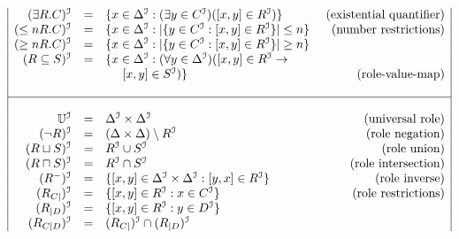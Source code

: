 \documentclass[a4paper,UKenglish]{lipics}
\newcommand{\universalrole}{\mathbb{U}}
\begin{document}
\begin{table}
\begin{math}
\begin{array}{|rclr|}
(\exists R.C)^{\I}& = & \{x \in \Delta^{\I} : (\exists y \in C^{\I})([x,y] \in R^{\I}) \}
&\mbox{ (existential quantifier)}\\
(\leq n R.C)^{\I} & = & \{x \in \Delta^{\I} : |\{y \in C^{\I} : [x,y] \in R^{\I} \}| \leq n\} & \mbox{ (number restrictions)}\\
(\geq n R.C)^{\I} & = & \{x \in \Delta^{\I} : |\{y \in C^{\I} : [x,y] \in R^{\I} \}| \geq n\} &\\
(R \subseteq S)^{\I} & = & \{x \in \Delta^{\I} : (\forall y \in \Delta^{\I})([x,y] \in R^{\I} \rightarrow &\\
  &&\;\;\;\;\;[x,y] \in S^{\I})\}& \mbox{ (role-value-map)}\\
&&&\\
\hline
&&&\\
\universalrole^{\I} & = & \Delta^{\I} \times \Delta^{\I} & \mbox{ (universal role)}\\
(\neg R)^{\I} & = & (\Delta \times \Delta) \setminus R^{\I} & \mbox{  (role negation)}\\
(R \sqcup S)^{\I} & = & R^{\I} \cup S^{\I} & \mbox{ (role union)}\\
(R \sqcap S)^{\I} & = & R^{\I} \cap S^{\I} & \mbox{ (role intersection)}\\
(R^{-})^{\I} & = & \{[x,y] \in \Delta^{\I}\times\Delta^{\I} : [y,x] \in  R^{\I}\} & \mbox{ (role inverse)}\\
(R_{C|})^{\I} & = & \{ [x,y] \in R^{\I} : x \in C^{\I} \} & \mbox{ (role restrictions)}\\
(R_{|D})^{\I} & = & \{ [x,y] \in R^{\I} : y \in D^{\I} \} & \\
(R_{C|D})^{\I} & = & (R_{C|})^{\I} \cap (R_{|D})^{\I} & \\


\end{array}
\end{math}
\end{table}
\end{document}
